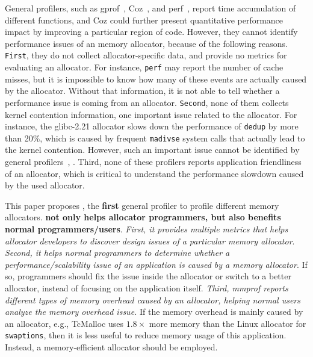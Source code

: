 General profilers, such as gprof~\citep{DBLP:conf/sigplan/GrahamKM82}, Coz~\citep{Coz}, and perf~\citep{perf}, report time accumulation of different functions, and Coz could further present quantitative performance impact by improving a particular region of code. However, they cannot identify performance issues of an memory allocator, because of the following reasons.  \texttt{First}, they do not collect allocator-specific data, and provide no metrics for evaluating an allocator. For instance, \texttt{perf} may report the number of cache misses, but it is impossible to know how many of these events are actually caused by the allocator. Without that information, it is not able to tell whether a performance issue is coming from an allocator. \texttt{Second}, none of them collects kernel contention information, one important issue related to the allocator. For instance, the glibc-2.21 allocator slows down the performance of \texttt{dedup} by more than 20\%, which is caused by frequent \texttt{madivse} system calls that actually lead to the kernel contention. However, such an important issue cannot be identified by general profilers~\citep{DBLP:conf/sigplan/GrahamKM82, Coz, perf}, . Third, none of these profilers reports application friendliness of an allocator, which is critical to understand the performance slowdown caused by the used allocator.   

This paper proposes \MP{}, the \textbf{first} general profiler to profile different memory allocators. \textbf{\MP{} not only helps allocator programmers, but also benefits normal programmers/users}. \textit{First, it provides multiple metrics that helps allocator developers to discover design issues of a particular memory allocator}.  \textit{Second, it helps normal programmers to determine whether a performance/scalability issue of an application is caused by a memory allocator}. 
If so,  programmers should fix the issue inside the allocator or switch to a better allocator, instead of focusing on the application itself. 
\textit{Third, mmprof reports different types of memory overhead caused by an allocator, helping normal users analyze the memory overhead issue.} 
If the memory overhead is mainly caused by an allocator, e.g., TcMalloc uses $1.8\times$ more memory than the Linux allocator for \texttt{swaptions}, then it is less useful to reduce memory usage of this application. Instead, a memory-efficient allocator should be employed.   


